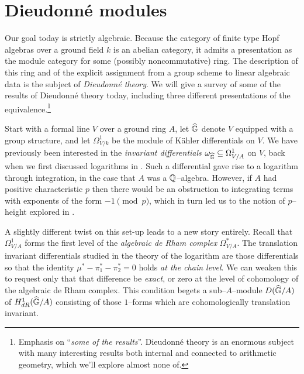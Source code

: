 \section{Dieudonn\'e modules}\label{SectionDieudonneModules}

Our goal today is strictly algebraic.  Because the category of finite type Hopf algebras over a ground field $k$ is an abelian category, it admits a presentation as the module category for some (possibly noncommutative) ring.  The description of this ring and of the explicit assignment from a group scheme to linear algebraic data is the subject of \textit{Dieudonn\'e theory}.  We will give a survey of some of the results of Dieudonn\'e theory today, including three different presentations of the equivalence.\footnote{Emphasis on ``\emph{some of the results}''.  Dieudonn\'e theory is an enormous subject with many interesting results both internal and connected to arithmetic geometry, which we'll explore almost none of.}

Start with a formal line $V$ over a ground ring $A$, let $\widehat{\mathbb G}$ denote $V$ equipped with a group structure, and let $\Omega^1_{V/k}$ be the module of K\"ahler differentials on $V$.  We have previously been interested in the \textit{invariant differentials} $\omega_{\widehat{\mathbb G}} \subseteq \Omega^1_{V/A}$ on $V$, back when we first discussed logarithms in .  Such a differential gave rise to a logarithm through integration, in the case that $A$ was a $\mathbb{Q}$--algebra.  However, if $A$ had positive characteristic $p$ then there would be an obstruction to integrating terms with exponents of the form $-1 \pmod p$, which in turn led us to the notion of $p$--height explored in .

A slightly different twist on this set-up leads to a new story entirely.  Recall that $\Omega^1_{V/A}$ forms the first level of the \textit{algebraic de Rham complex} $\Omega^*_{V/A}$.  The translation invariant differentials studied in the theory of the logarithm are those differentials so that the identity $\mu^* - \pi_1^* - \pi_2^* = 0$ holds \emph{at the chain level}.  We can weaken this to request only that that difference be \emph{exact}, or zero at the level of cohomology of the algebraic de Rham complex.  This condition begets a sub--$A$--module $D(\widehat{\mathbb G}/A)$ of $H^1_{dR}(\widehat{\mathbb G}/A)$ consisting of those $1$--forms which are cohomologically translation invariant.


